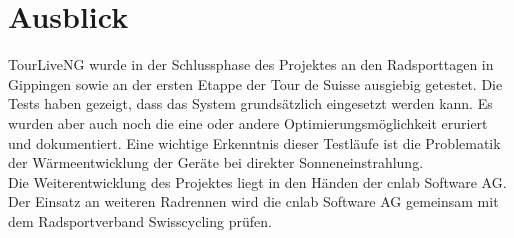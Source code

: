 \section*{Ausblick}
TourLiveNG wurde in der Schlussphase des Projektes an den Radsporttagen in Gippingen sowie an der ersten Etappe der Tour de Suisse ausgiebig getestet. Die Tests haben gezeigt, dass das System grundsätzlich eingesetzt werden kann. Es wurden aber auch noch die eine oder andere Optimierungsmöglichkeit eruriert und dokumentiert. Eine wichtige Erkenntnis dieser Testläufe ist die Problematik der Wärmeentwicklung der Geräte bei direkter Sonneneinstrahlung. 
\\

Die Weiterentwicklung des Projektes liegt in den Händen der cnlab Software AG. Der Einsatz an weiteren Radrennen wird die cnlab Software AG gemeinsam mit dem Radsportverband Swisscycling prüfen.

